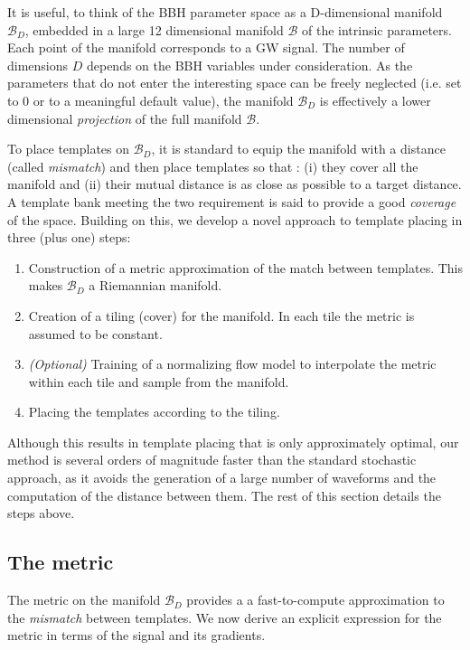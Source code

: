 \documentclass[twocolumn,showpacs,preprintnumbers,nofootinbib,prd,
superscriptaddress,10pt]{revtex4-2}
\begin{document}
It is useful, to think of the BBH parameter space as a D-dimensional manifold $\mathcal{B}_D$, embedded in a large 12 dimensional manifold $\mathcal{B}$ of the intrinsic parameters. Each point of the manifold corresponds to a GW signal. The number of dimensions $D$ depends on the BBH variables under consideration.
As the parameters that do not enter the interesting space can be freely neglected (i.e. set to $0$ or to a meaningful default value), the manifold $\mathcal{B}_D$ is effectively a lower dimensional {\it projection} of the full manifold $\mathcal{B}$.

To place templates on $\mathcal{B}_D$, it is standard to equip the manifold with a distance (called {\it mismatch}) and then place templates so that \cite{Allen:2021yuy}: (i) they cover all the manifold and (ii) their mutual distance is as close as possible to a target distance.
A template bank meeting the two requirement is said to provide a good {\it coverage} of the space.
Building on this, we develop a novel approach to template placing in three (plus one) steps:

\begin{enumerate}
	\item Construction of a metric approximation of the match between templates. This makes $\mathcal{B}_D$ a Riemannian manifold.
	\item Creation of a tiling (cover) for the manifold. In each tile the metric is assumed to be constant.
	\item \textit{(Optional)} Training of a normalizing flow model to interpolate the metric within each tile and sample from the manifold. 
	\item Placing the templates according to the tiling.
\end{enumerate}
Although this results in template placing that is only approximately optimal, our method is several orders of magnitude faster than the standard stochastic approach, as it avoids the generation of a large number of waveforms and the computation of the distance between them.
The rest of this section details the steps above.

\subsection{The metric} \label{sec:metric}

The metric on the manifold $\mathcal{B}_D$ provides a a fast-to-compute approximation to the {\it mismatch} between templates. We now derive an explicit expression for the metric in terms of the signal and its gradients.
\end{document}
